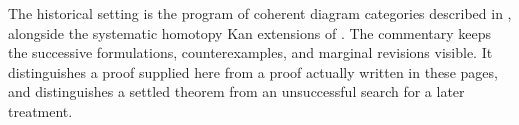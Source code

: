 \begin{otherlanguage}{english}
The historical setting is the program of coherent diagram categories described in \citet[\S69]{Grothendieck1983}, alongside the systematic homotopy Kan extensions of \citet{Heller1988}. The commentary keeps the successive formulations, counterexamples, and marginal revisions visible. It distinguishes a proof supplied here from a proof actually written in these pages, and distinguishes a settled theorem from an unsuccessful search for a later treatment.

\endgroup
\end{otherlanguage}
\dgrchunkend

